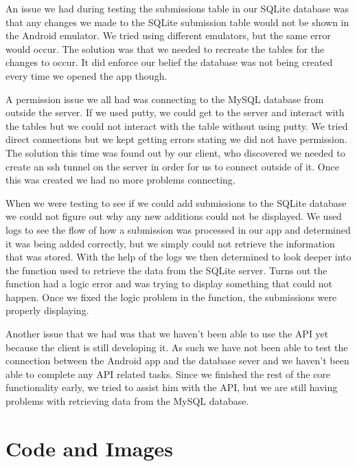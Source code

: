 \documentclass[onecolumn, draftclsnofoot,10pt, compsoc]{IEEEtran}
\begin{document}
An issue we had during testing the submissions table in our SQLite database was that any changes we made to the SQLite submission table would not be shown in the Android emulator. We tried using different emulators, but the same error would occur. The solution was that we needed to recreate the tables for the changes to occur. It did enforce our belief the database was not being created every time we opened the app though.

A permission issue we all had was connecting to the MySQL database from outside the server. If we used putty, we could get to the server and interact with the tables but we could not interact with the table without using putty. We tried direct connections but we kept getting errors stating we did not have permission. The solution this time was found out by our client, who discovered we needed to create an ssh tunnel on the server in order for us to connect outside of it. Once this was created we had no more problems connecting.

When we were testing to see if we could add submissions to the SQLite database we could not figure out why any new additions could not be displayed. We used logs to see the flow of how a submission was processed in our app and determined it was being added correctly, but we simply could not retrieve the information that was stored. With the help of the logs we then determined to look deeper into the function used to retrieve the data from the SQLite server. Turns out the function had a logic error and was trying to display something that could not happen. Once we fixed the logic problem in the function, the submissions were properly displaying.

Another issue that we had was that we haven't been able to use the API yet because the client is still developing it. As such we have not been able to test the connection between the Android app and the database sever and we haven't been able to complete any API related tasks. Since we finished the rest of the core functionality early, we tried to assist him with the API, but we are still having problems with retrieving data from the MySQL database.\newline\newline

\section{Code and Images}
\end{document}
